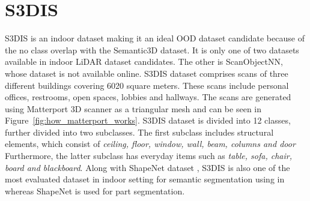 \section{S3DIS}
S3DIS is an indoor dataset making it an ideal OOD dataset candidate because of the no class overlap with the Semantic3D dataset.
It is only one of two datasets available in indoor LiDAR dataset candidates. 
The other is ScanObjectNN, whose dataset is not available online.
S3DIS dataset comprises scans of three different buildings covering 6020 square meters.
These scans include personal offices, restrooms, open spaces, lobbies and hallways.
The scans are generated using Matterport 3D scanner as a triangular mesh and can be seen in Figure~\ref{fig:how_matterport_works}.
S3DIS dataset is divided into 12 classes, further divided into two subclasses.
The first subclass includes structural elements, which consist of \textit{ceiling, floor, window, wall, beam, columns and door}
Furthermore, the latter subclass has everyday items such as \textit{table, sofa, chair, board and blackboard}.
Along with ShapeNet dataset \cite{chang2015shapenet}, S3DIS is also one of the most evaluated dataset in indoor setting for semantic segmentation  using in \cite{Armeni_2016_CVPR_S3DIS} whereas ShapeNet is used for part segmentation.
